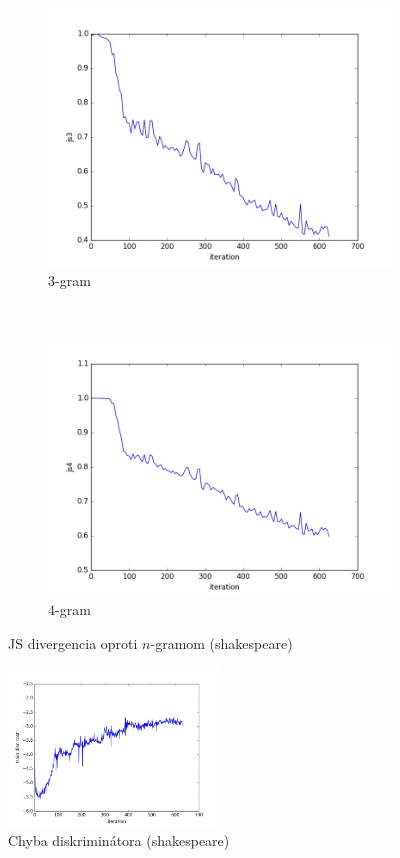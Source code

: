 \documentclass[10pt,a4paper]{article}
\begin{document}
\begin{figure}[H]
    \begin{subfigure}[b]{0.4\textwidth}
        \includegraphics[width=\textwidth]{romeo/js3}
        \caption{$3$-gram}
    \end{subfigure}
    ~ 
    \begin{subfigure}[b]{0.4\textwidth}
        \includegraphics[width=\textwidth]{romeo/js4}
        \caption{$4$-gram}
    \end{subfigure}
    \caption{JS divergencia oproti $n$-gramom (shakespeare)}\label{fig:animals}
\end{figure}
\begin{figure}[H]
	\centering
	\includegraphics[width=0.5\textwidth]{romeo/train_disc_cost}
    \caption{Chyba diskriminátora (shakespeare) }
\end{figure}
\end{document}
